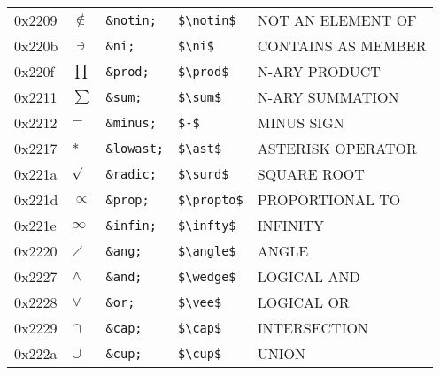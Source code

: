 \documentclass[a4paper,10pt]{article}
\begin{document}
{\begin{center}
\begin{xtabular}{llllp{10cm}}
0x2209 & $\notin$               & \texttt{\&notin;}   & \texttt{\${\textbackslash}notin\$}                     & NOT AN ELEMENT OF                          \\
0x220b & $\ni$                  & \texttt{\&ni;}      & \texttt{\${\textbackslash}ni\$}                        & CONTAINS AS MEMBER                         \\
0x220f & $\prod$                & \texttt{\&prod;}    & \texttt{\${\textbackslash}prod\$}                      & N-ARY PRODUCT                              \\
0x2211 & $\sum$                 & \texttt{\&sum;}     & \texttt{\${\textbackslash}sum\$}                       & N-ARY SUMMATION                            \\
0x2212 & $-$                    & \texttt{\&minus;}   & \texttt{\$-\$}                                         & MINUS SIGN                                 \\
0x2217 & $\ast$                 & \texttt{\&lowast;}  & \texttt{\${\textbackslash}ast\$}                       & ASTERISK OPERATOR                          \\
0x221a & $\surd$                & \texttt{\&radic;}   & \texttt{\${\textbackslash}surd\$}                      & SQUARE ROOT                                \\
0x221d & $\propto$              & \texttt{\&prop;}    & \texttt{\${\textbackslash}propto\$}                    & PROPORTIONAL TO                            \\
0x221e & $\infty$               & \texttt{\&infin;}   & \texttt{\${\textbackslash}infty\$}                     & INFINITY                                   \\
0x2220 & $\angle$               & \texttt{\&ang;}     & \texttt{\${\textbackslash}angle\$}                     & ANGLE                                      \\
0x2227 & $\wedge$               & \texttt{\&and;}     & \texttt{\${\textbackslash}wedge\$}                     & LOGICAL AND                                \\
0x2228 & $\vee$                 & \texttt{\&or;}      & \texttt{\${\textbackslash}vee\$}                       & LOGICAL OR                                 \\
0x2229 & $\cap$                 & \texttt{\&cap;}     & \texttt{\${\textbackslash}cap\$}                       & INTERSECTION                               \\
0x222a & $\cup$                 & \texttt{\&cup;}     & \texttt{\${\textbackslash}cup\$}                       & UNION                                      \\

\end{xtabular}
\end{center}}
\end{document}
